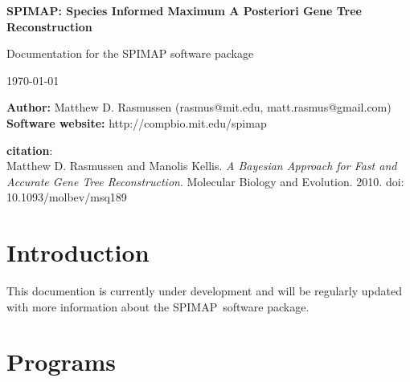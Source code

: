 \documentclass[11pt]{article}
\newcommand{\spimap}{{\sf\scshape SPIMAP}}
\begin{document}

\begin{center}
{\Huge \bf 
SPIMAP: Species Informed Maximum A Posteriori Gene Tree Reconstruction
}

\vspace{.2in}

{\LARGE 
Documentation for the SPIMAP software package
}

{\LARGE \today}


\vspace{.5in}

{\bf Author:} Matthew D. Rasmussen (rasmus@mit.edu, matt.rasmus@gmail.com) \\
{\bf Software website:} http://compbio.mit.edu/spimap

\vspace{.1in}

{\bf citation}: \\
Matthew D. Rasmussen and Manolis Kellis.
{\it A Bayesian Approach for Fast and Accurate Gene Tree Reconstruction}.
Molecular Biology and Evolution. 2010. doi: 10.1093/molbev/msq189

\end{center}

\newpage

\tableofcontents

\newpage

\section{Introduction}

This documention is currently under development and will be regularly 
updated with more information about the \spimap\ software package.


\section{Programs}
\end{document}
